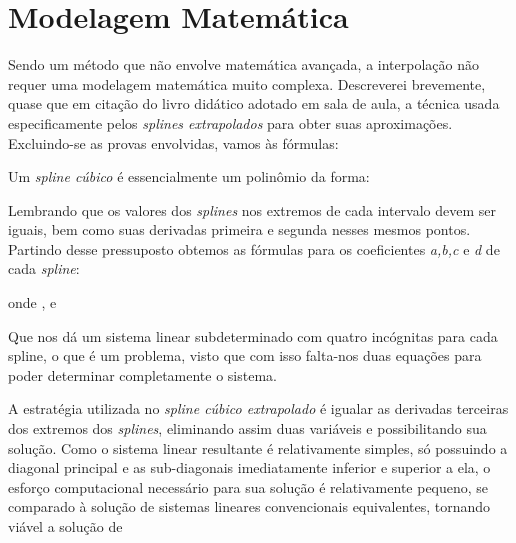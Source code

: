 \section{Modelagem Matemática}

Sendo um método que não envolve matemática avançada, a interpolação não requer uma modelagem matemática muito complexa. Descreverei brevemente, quase que em citação do livro didático adotado em sala de aula, a técnica usada especificamente pelos \textit{splines extrapolados} para obter suas aproximações. Excluindo-se as provas envolvidas, vamos às fórmulas:

Um \textit{spline cúbico} é essencialmente um polinômio da forma:
\begin{center}
\end{center}

Lembrando que os valores dos \textit{splines} nos extremos de cada intervalo devem ser iguais, bem como suas derivadas primeira e segunda nesses mesmos pontos. Partindo desse pressuposto obtemos as fórmulas para os coeficientes \textit{a,b,c} e \textit{d} de cada \textit{spline}:

\begin{center}
\end{center}

\begin{center}
\end{center}

\begin{center}
\end{center}

\begin{center}
\end{center}

onde , e 

Que nos dá um sistema linear subdeterminado com quatro incógnitas para cada spline, o que é um problema, visto que com isso falta-nos duas equações para poder determinar completamente o sistema.

A estratégia utilizada no \textit{spline cúbico extrapolado} é igualar as derivadas terceiras dos extremos dos \textit{splines}, eliminando assim duas variáveis e possibilitando sua solução. Como o sistema linear resultante é relativamente simples, só possuindo a diagonal principal e as sub-diagonais imediatamente inferior e superior a ela, o esforço computacional necessário para sua solução é relativamente pequeno, se comparado à solução de sistemas lineares convencionais equivalentes, tornando viável a solução de 

